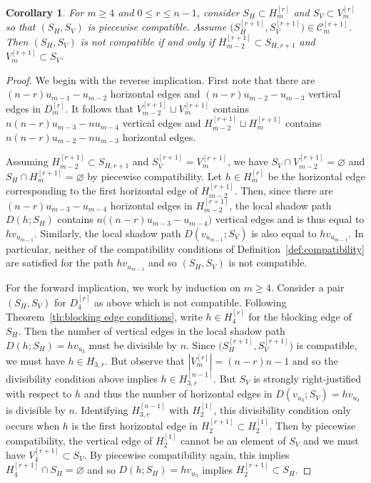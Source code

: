 \documentclass{amsart}
\newtheorem{corollary}[theorem]{Corollary}
\numberwithin{equation}{section}
\newcommand{\cC}{\mathcal{C}}
\begin{document}
\begin{corollary}
  \label{cor:piecewise not compatible}
  For $m\ge4$ and $0\le r\le n-1$, consider $S_H\subset H_m^{[r]}$ and $S_V\subset V_m^{[r]}$ so that $(S_H,S_V)$ is piecewise compatible.
  Assume $\big(S_H^{[r+1]},S_V^{[r+1]}\big)\in\cC_m^{[r+1]}$.
  Then $(S_H,S_V)$ is not compatible if and only if $H_{m-2}^{[r+1]}\subset S_{H,r+1}$ and $V_m^{[r+1]}\subset S_V$.
\end{corollary}
\begin{proof}
  We begin with the reverse implication.
  First note that there are $(n-r)u_{m-1}-u_{m-2}$ horizontal edges and $(n-r)u_{m-2}-u_{m-3}$ vertical edges in $D_m^{[r]}$. 
  It follows that $V_{m-2}^{[r+1]}\sqcup V_m^{[r+1]}$ contains $n(n-r)u_{m-3}-nu_{m-4}$ vertical edges and $H_{m-2}^{[r+1]}\sqcup H_m^{[r+1]}$ contains $n(n-r)u_{m-2}-nu_{m-3}$ horizontal edges.

  Assuming $H_{m-2}^{[r+1]}\subset S_{H,r+1}$ and $S_V^{[r+1]}=V_m^{[r+1]}$, we have $S_V\cap V_{m-2}^{[r+1]}=\varnothing$ and $S_H\cap H_m^{[r+1]}=\varnothing$ by piecewise compatibility.
  Let $h\in H_m^{[r]}$ be the horizontal edge corresponding to the first horizontal edge of $H_{m-2}^{[r+1]}$.
  Then, since there are $(n-r)u_{m-3}-u_{m-4}$ horizontal edges in $H_{m-2}^{[r+1]}$, the local shadow path $D(h;S_H)$ contains $n\big((n-r)u_{m-3}-u_{m-4}\big)$ vertical edges and is thus equal to $hv_{u_{m-1}}$.
  Similarly, the local shadow path $D(v_{u_{m-1}};S_V)$ is also equal to $hv_{u_{m-1}}$.
  In particular, neither of the compatibility conditions of Definition~\ref{def:compatibility} are satisfied for the path $hv_{u_{m-1}}$ and so $(S_H,S_V)$ is not compatible.

  For the forward implication, we work by induction on $m\ge4$.
  Consider a pair $(S_H,S_V)$ for $D_4^{[r]}$ as above which is not compatible.
  Following Theorem~\ref{th:blocking edge conditions}, write $h\in H_4^{[r]}$ for the blocking edge of $S_H$.
  Then the number of vertical edges in the local shadow path $D(h;S_H)=hv_{u_3}$ must be divisible by $n$. 
  Since $\big(S_H^{[r+1]},S_V^{[r+1]}\big)$ is compatible, we must have $h\in H_{3,r}$.
  But observe that $|V_m^{[r]}|=(n-r)n-1$ and so the divisibility condition above implies $h\in H_{3,r}^{[n-1]}$.
  But $S_V$ is strongly right-justified with respect to $h$ and thus the number of horizontal edges in $D(v_{u_3};S_V)=hv_{u_3}$ is divisible by $n$.
  Identifying $H_{3,r}^{[n-1]}$ with $H_2^{[1]}$, this divisibility condition only occurs when $h$ is the first horizontal edge in $H_2^{[r+1]}\subset H_2^{[1]}$.
  Then by piecewise compatibility, the vertical edge of $H_2^{[1]}$ cannot be an element of $S_V$ and we must have $V_4^{[r+1]}\subset S_V$.
  By piecewise compatibility again, this implies $H_4^{[r+1]}\cap S_H=\varnothing$ and so $D(h;S_H)=hv_{u_3}$ implies $H_2^{[r+1]}\subset S_H$.


\end{proof}
\end{document}
